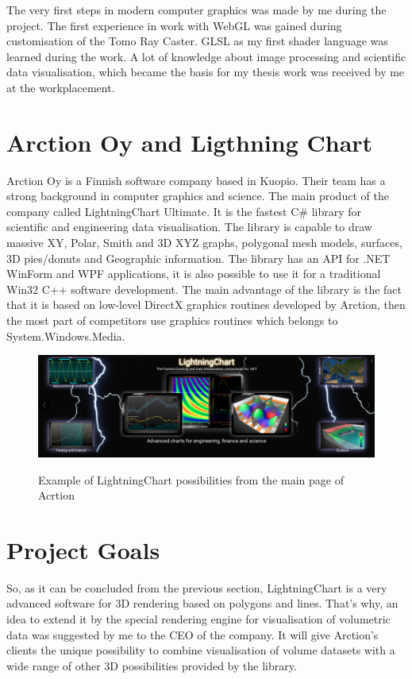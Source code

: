 \documentclass[twoside, english, 11pt]{report}
\begin{document}
The very first steps in modern computer graphics was made by me during the project. The first experience in work with WebGL was gained during customisation of the Tomo Ray Caster. GLSL as my first shader language was learned during the work. A lot of knowledge about image processing and scientific data visualisation, which became the basis for my thesis work was received by me at the workplacement.


\section{Arction Oy and Ligthning Chart}

Arction Oy is a Finnish software company based in Kuopio. Their team has a strong background in computer graphics and science. The main product of the company called LightningChart Ultimate. It is the fastest C\# library for scientific and engineering data visualisation. The library is capable to draw massive XY, Polar, Smith and 3D XYZ graphs, polygonal mesh models, surfaces, 3D pies/donuts and Geographic information. The library has an API for .NET WinForm and WPF applications, it is also possible to use it for a traditional Win32 C++ software development. The main advantage of the library is the fact that it is based on low-level DirectX graphics routines developed by Arction, then the most part of competitors use graphics routines which belongs to System.Windows.Media.\\
\begin{figure}[H]
\includegraphics[scale=0.33]{img/lchu}\\
\caption{Example of LightningChart possibilities from the main page of Acrtion}
\end{figure}

\section{Project Goals}

So, as it can be concluded from the previous section, LightningChart is a very advanced software for 3D rendering based on polygons and lines. That's why, an idea to extend it by the special rendering engine for visualisation of volumetric data was suggested by me to the CEO of the company. It will give Arction's clients the unique possibility to combine visualisation of volume datasets with a wide range of other 3D possibilities provided by the library. \\
\end{document}
